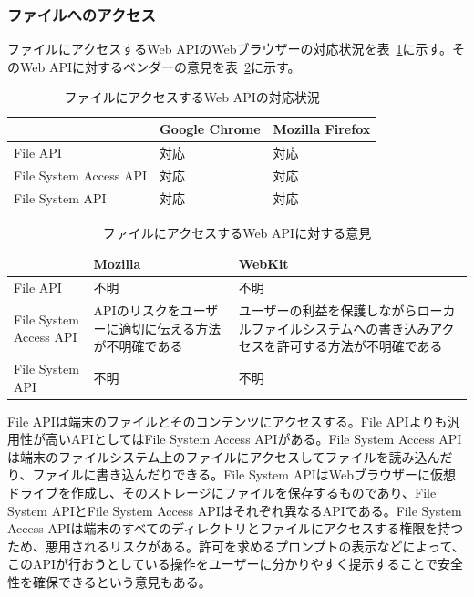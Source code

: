 \subsubsection{ファイルへのアクセス}\label{subsubsection:ファイルへのアクセス}
ファイルにアクセスするWeb APIのWebブラウザーの対応状況を表~\ref{table:ファイルにアクセスするWeb APIの対応状況}に示す。そのWeb APIに対するベンダーの意見を表~\ref{table:ファイルにアクセスするWeb APIに対する意見}に示す。
\begin{table}
  \caption{ファイルにアクセスするWeb APIの対応状況}\label{table:ファイルにアクセスするWeb APIの対応状況}
  \centering
  \begin{tabular}{|p{13em}|p{8em}|p{8em}|}
    \hline
    & Google Chrome & Mozilla Firefox \\ \hline
    File API & \cellcolor{green!25}対応 & \cellcolor{green!25}対応 \\ \hline
    File System Access API & \cellcolor{green!25}対応 & \cellcolor{green!25}対応 \\ \hline
    File System API & \cellcolor{green!25}対応 & \cellcolor{green!25}対応 \\ \hline
  \end{tabular}
\end{table}
\begin{table}
  \caption{ファイルにアクセスするWeb APIに対する意見}
  \label{table:ファイルにアクセスするWeb APIに対する意見}
    \centering
    \begin{tabular}{|p{13em}|p{13em}|p{13em}|}
        \hline
        & Mozilla & WebKit \\ \hline
        File API & 不明 & 不明 \\ \hline
        File System Access API & \cellcolor{red!25}APIのリスクをユーザーに適切に伝える方法が不明確である\cite{MozillaFileSystemAccessAPI} & \cellcolor{red!25}ユーザーの利益を保護しながらローカルファイルシステムへの書き込みアクセスを許可する方法が不明確である~\cite{WebKitFileSystemAccessAPI} \\ \hline
        File System API & 不明 & 不明\\ \hline
    \end{tabular}
\end{table}
File APIは端末のファイルとそのコンテンツにアクセスする。File APIよりも汎用性が高いAPIとしてはFile System Access APIがある。File System Access APIは端末のファイルシステム上のファイルにアクセスしてファイルを読み込んだり、ファイルに書き込んだりできる。File System APIはWebブラウザーに仮想ドライブを作成し、そのストレージにファイルを保存するものであり、File System APIとFile System Access APIはそれぞれ異なるAPIである。File System Access APIは端末のすべてのディレクトリとファイルにアクセスする権限を持つため、悪用されるリスクがある。許可を求めるプロンプトの表示などによって、このAPIが行おうとしている操作をユーザーに分かりやすく提示することで安全性を確保できるという意見もある。
